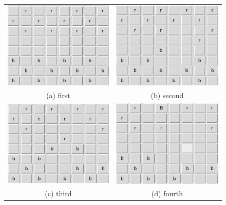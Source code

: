 \documentclass{article}
\begin{document}
\begin{figure}
\begin{tabular}{cc}
  \includegraphics[width=65mm]{images/game-start.png} &   \includegraphics[width=65mm]{images/game-1.png} \\
(a) first & (b) second \\[6pt]
 \includegraphics[width=65mm]{images/game-2.png} &   \includegraphics[width=65mm]{images/game-3.png} \\
(c) third & (d) fourth \\[6pt]

\end{tabular}
\end{figure}
\end{document}

